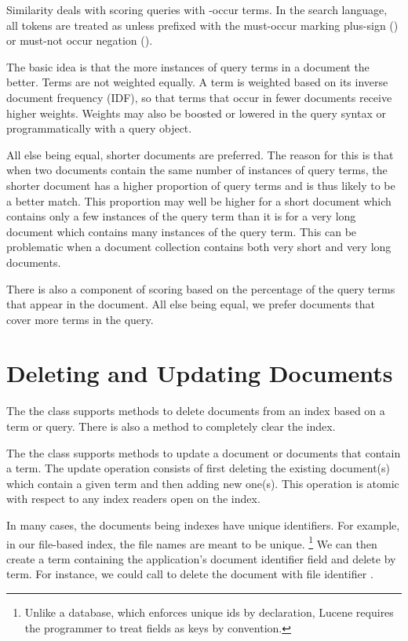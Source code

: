 Similarity deals with scoring queries with -occur terms.
In the search language, all tokens are treated as 
unless prefixed with the must-occur marking plus-sign
(\code{+}) or must-not occur negation (\code{-}).

The basic idea is that the more instances of query terms in a document
the better.  Terms are not weighted equally.  A term is weighted based
on its inverse document frequency (IDF), so that terms that occur in
fewer documents receive higher weights.  Weights may also be boosted
or lowered in the query syntax or programmatically with a query object.

All else being equal, shorter documents are preferred.
The reason for this is that when two documents contain the same number of
instances of query terms, the shorter document has a higher proportion of query
terms and is thus likely to be a better match.
This proportion may well be higher for a short document which contains only
a few instances of the query term than it is for a very long document which
contains many instances of the query term.
This can be problematic when a document collection contains both
very short and very long documents.

There is also a component of scoring based on the percentage of the
query terms that appear in the document.  All else being equal, we
prefer documents that cover more terms in the query.


\section{Deleting and Updating Documents}\label{section:lucene-delete}

The the  class supports methods to delete documents
from an index based on a term or query.
There is also a  method to completely clear the index.

The the  class supports methods to update a document
or documents that contain a term.  The update operation consists of first
deleting the existing document(s) which contain a given term and then
adding new one(s).  This operation is atomic with respect to any index
readers open on the index.

In many cases, the documents being indexes have unique identifiers.
For example, in our file-based index, the file names are meant to be unique.%
%
\footnote{Unlike a database, which enforces unique ids by declaration,
Lucene requires the programmer to treat fields as keys by convention.}
%
We can then create a term containing the application's document
identifier field and delete by term.  For instance, we could call
 to delete the
document with file identifier .

